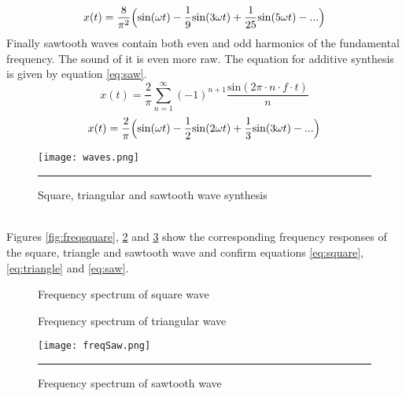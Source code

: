 \begin{equation}
x(t) = \frac{8}{\pi^{2}} \Bigl( \mathrm{sin}(\omega t) - \frac{1}{9} \mathrm{sin} (\mathrm{3} \omega t) + \frac{1}{25}\mathrm{sin}(\mathrm{5}\omega t) - ... \Bigr)
\label{eq:triangle2}
\end{equation} 
Finally sawtooth waves contain both even and odd harmonics of the fundamental frequency. The sound of it is even more raw. The equation for additive synthesis is given by equation \ref{eq:saw}.
\begin{equation}
x(t) = \frac{2}{\pi} \sum_{n=1}^{\infty} (-1)^{n+1} \frac{\mathrm{sin}(2\pi \cdot n \cdot f \cdot t)}{n}
\label{eq:saw}
\end{equation} 
\begin{equation}
x(t) = \frac{2}{\pi} \Bigl( \mathrm{sin}(\omega t) - \frac{1}{2} \mathrm{sin}(2\omega t) + \frac{1}{3} \mathrm{sin}(3\omega t) - ... \Bigr)
\label{eq:saw2}
\end{equation} 
\begin{figure}[htbp]
\centering
\texttt{[image: waves.png]}
\rule{30em}{0.5pt}
\caption{Square, triangular and sawtooth wave synthesis}
\label{fig:waves}
\end{figure} \\
Figures \ref{fig:freqsquare}, \ref{fig:freqTriangle} and \ref{fig:freqSawtooth} show the corresponding frequency responses of the square, triangle and sawtooth wave and confirm equations \ref{eq:square}, \ref{eq:triangle} and \ref{eq:saw}. 
\begin{figure}[ht]
  \hfill
  \begin{minipage}[t]{.45\textwidth}
    \begin{center}  
      \caption{Frequency spectrum of square wave}
      \label{fig:freqsquare}
    \end{center}
  \end{minipage}
  \hfill
  \begin{minipage}[t]{.45\textwidth}
    \begin{center}  
      \caption{Frequency spectrum of triangular wave}
      \label{fig:freqTriangle}
    \end{center}
  \end{minipage}
  \hfill
\end{figure}
\begin{figure}[htbp]
\centering
\texttt{[image: freqSaw.png]}
\rule{30em}{0.5pt}
\caption{Frequency spectrum of sawtooth wave}
\label{fig:freqSawtooth}
\end{figure}
